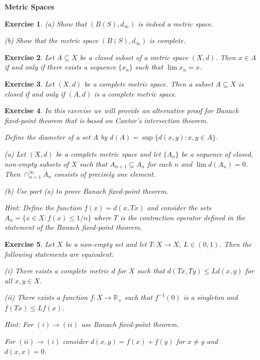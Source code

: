 \documentclass[letter,11pt]{article}
\newtheorem{exercise}{Exercise}[section]
\begin{document}
\textbf{Metric Spaces}

\begin{exercise} \label{Ex:B(S)_Complete}
  (a)  Show that $(B(S),d_{\infty})$ is indeed a metric space. 

  (b) Show that the metric space $(B(S),d_{\infty})$ is complete. 
\end{exercise}


\begin{exercise}
    Let $A \subseteq X$ be a closed subset of a metric space $(X,d)$. Then $x \in A$ if and only if there exists a sequence $\{x_{n} \}$ such that $\lim x_{n} = x$. 
\end{exercise}



\begin{exercise}
    Let $(X,d)$ be a complete metric space. Then a subset $A \subseteq X$ is closed if and only if $(A,d)$ is a complete metric space. 
\end{exercise}


\begin{exercise}
   In this exercise we will provide an alternative proof for Banach fixed-point theorem that is based on Cantor's intersection theorem. 


Define the diameter of a set $A$ by $d(A) = \sup \{ d(x,y): x,y \in A\}$.

   (a) Let $(X,d)$ be a complete metric space and let $\{A_{n}\}$ be a sequence of closed, non-empty subsets of $X$ such that $A_{n+1} \subseteq A_{n}$ for each $n$ and $\lim d(A_{n}) = 0 $. Then $\cap _{n=1}^{\infty} A_{n}$ consists of precisely one element. 


(b) Use part (a) to prove Banach fixed-point theorem. 

Hint: Define the function $f(x) = d(x,Tx)$ and consider the sets $A_{n} = \{x \in X: f(x) \leq 1/n \} $ where $T$ is the contraction operator defined in the statement of the Banach fixed-point theorem. 
\end{exercise}

\begin{exercise}
     Let $X$ be a non-empty set and let $T: X \rightarrow X$, $L \in (0,1)$. Then the following statements are equivalent: 

     (i) There exists a complete metric $d$ for $X $ such that $d(Tx,Ty) \leq L d(x,y)$ for all $x,y \in X$. 

     (ii) There exists a function $f:X \rightarrow \mathbb{R}_{+}$ such that $f^{-1}(0)$ is a singleton and $f(Tx) \leq L f(x)$. 

     Hint: For $(i) \rightarrow (ii)$ use Banach fixed-point theorem. 

     For $(ii) \rightarrow (i)$ consider $d(x,y) = f(x) + f(y)$ for $x \neq y$ and $d(x,x) = 0$. 
\end{exercise}
\end{document}
